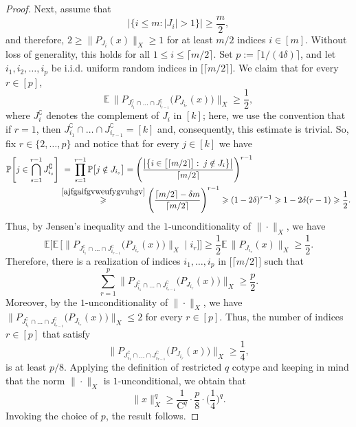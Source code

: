 \documentclass[11pt,leqno]{amsart}
\theoremstyle{remark}
\theoremstyle{plain}
\newcommand{\Exp}{\mathbb{E}}
\begin{document}
\begin{proof}
Next, assume that
$$ \big|\{i\leqslant m\colon |J_i|>1\}\big|\geqslant \frac{m}{2}, $$
and therefore, $2\geqslant \|P_{J_i}(x)\|_X \geqslant 1$ for at least $m/2$ indices $i\in [m]$.
Without loss of generality, this holds for all $1\leqslant i\leqslant \lceil m/2\rceil$.
Set $p:=\lceil 1/(4\delta)\rceil$, and let $i_1,i_2,\dots,i_p$ be i.i.d. uniform
random indices in $\big[\lceil m/2\rceil\big]$. We claim that for every $r \in [p]$,
$$ \Exp\,\big\| P_{J_{i_1}^\complement\cap\dots\cap J_{i_{r-1}}^\complement}\big( P_{J_{i_r}}(x)\big)\big\|_X \geqslant \frac{1}{2}, $$
where $J_i^\complement$ denotes the complement of $J_i$ in $[k]$; here, we use the convention that if $r=1$,
then $J_{i_1}^\complement\cap\dots\cap J_{i_{r-1}}^\complement = [k]$ and, consequently, this estimate is trivial.
So, fix $r\in \{2,\dots, p\}$ and notice that for every $j\in [k]$ we have
\begin{align*}
\mathbb{P}\Bigg[ j\in \bigcap_{s=1}^{r-1} J^\complement_{i_s} \Bigg]
& \ = \,\prod_{s=1}^{r-1} \mathbb{P}\big[j\notin J_{i_s}\big] =
\Bigg( \frac{\big|\big\{i\in \big[\lceil m/2\rceil\big]:\; j\notin J_i\big\}\big|}{\lceil m/2\rceil} \Bigg)^{r-1} \\
& \stackrel{\eqref{ajfgaifgvweufygvuhgv}}{\geqslant}
\Bigg( \frac{\lceil m/2\rceil - \delta m}{\lceil m/2\rceil} \Bigg)^{r-1}
\geqslant (1-2\delta)^{r-1} \geqslant 1 - 2 \delta (r-1) \geqslant \frac{1}{2}.
\end{align*}
Thus, by Jensen's inequality and the $1$-unconditionality of $\|\cdot\|_X$, we have
$$ \Exp \Big[\Exp\,\big[\big\|
P_{J_{i_1}^\complement\cap\dots\cap J_{i_{r-1}}^\complement}\big( P_{J_{i_r}}(x)\big)
\big\|_X\;\big|\;i_r\big]\Big]
\geqslant \frac{1}{2}\Exp\,\big\| P_{J_{i_r}}(x)\big\|_X\geqslant \frac{1}{2}. $$
Therefore, there is a realization of indices $i_1,\dots,i_p$ in $\big[\lceil m/2\rceil\big]$ such that
$$ \sum_{r=1}^p\big\| P_{J_{i_1}^\complement\cap\dots\cap J_{i_{r-1}}^\complement}\big( P_{J_{i_r}}(x)\big) \big\|_X \geqslant \frac{p}{2}. $$
Moreover, by the $1$-unconditionality of $\|\cdot\|_X$, we have
$\big\| P_{J_{i_1}^\complement\cap\dots\cap J_{i_{r-1}}^\complement}\big( P_{J_{i_r}}(x)\big)\big\|_X\leqslant 2$
for every $r\in [p]$. Thus, the number of indices $r\in [p]$ that satisfy
$$ \big\| P_{J_{i_1}^\complement\cap\dots\cap J_{i_{r-1}}^\complement}\big( P_{J_{i_r}}(x)\big)\big\|_X\geqslant\frac{1}{4}, $$
is at least $p/8$. Applying the definition of restricted $q$ cotype
and keeping in mind that the norm $\|\cdot\|_X$ is $1$-unconditional, we obtain that
$$ \|x\|_X^q \geqslant \frac{1}{\mathrm{C}^{q}}\cdot \frac{p}{8}\cdot \Big(\frac{1}{4}\Big)^q. $$
Invoking the choice of $p$, the result follows.
\end{proof}
\end{document}
